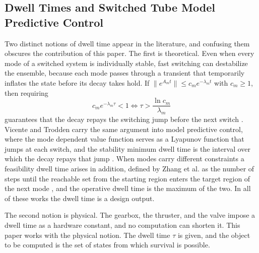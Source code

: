 \documentclass[journal]{IEEEtran}
\begin{document}
\subsection{Dwell Times and Switched Tube Model Predictive Control}

Two distinct notions of dwell time appear in the literature, and confusing them obscures the contribution of this paper. The first is theoretical. Even when every mode of a switched system is individually stable, fast switching can destabilize the ensemble, because each mode passes through a transient that temporarily inflates the state before its decay takes hold. If $\|e^{A_m t}\| \le c_m e^{-\lambda_m t}$ with $c_m \ge 1$, then requiring
\begin{equation}
c_m e^{-\lambda_m \tau} < 1 \iff \tau > \frac{\ln c_m}{\lambda_m}
\label{eq_mdt}
\end{equation}
guarantees that the decay repays the switching jump before the next switch \cite{hespanha1999}. Vicente and Trodden carry the same argument into model predictive control, where the mode dependent value function serves as a Lyapunov function that jumps at each switch, and the stability minimum dwell time is the interval over which the decay repays that jump \cite{vicente2019}. When modes carry different constraints a feasibility dwell time arises in addition, defined by Zhang et al. as the number of steps until the reachable set from the starting region enters the target region of the next mode \cite{zhang2016}, and the operative dwell time is the maximum of the two. In all of these works the dwell time is a design output.

The second notion is physical. The gearbox, the thruster, and the valve impose a dwell time as a hardware constant, and no computation can shorten it. This paper works with the physical notion. The dwell time $\tau$ is given, and the object to be computed is the set of states from which survival is possible.
\end{document}
